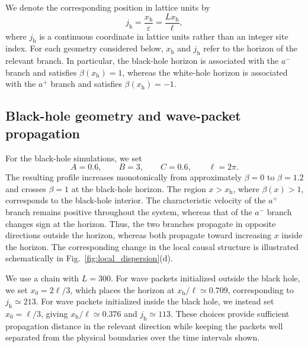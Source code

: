 \documentclass[reprint,amsmath,amssymb,aps,showkeys,superscriptaddress]{revtex4-2}
\begin{document}
We denote the corresponding position in lattice units by
\begin{equation}
  j_{\mathrm h}
  =
  \frac{x_{\mathrm h}}{\varepsilon}
  =
  \frac{Lx_{\mathrm h}}{\ell},
  \label{eq:lattice_horizon_position}
\end{equation}
where $j_{\mathrm h}$ is a continuous coordinate in lattice units
rather than an integer site index. For each geometry considered
below, $x_{\mathrm h}$ and $j_{\mathrm h}$ refer to the horizon of
the relevant branch. In particular, the black-hole horizon is
associated with the $a^-$ branch and satisfies
$\beta(x_{\mathrm h})=1$, whereas the white-hole horizon is
associated with the $a^+$ branch and satisfies
$\beta(x_{\mathrm h})=-1$.


\subsection{Black-hole geometry and wave-packet propagation}
\label{subsec:black_hole_dynamics}

For the black-hole simulations, we set
\begin{equation}
  A=0.6,
  \qquad
  B=3,
  \qquad
  C=0.6,
  \qquad
  \ell=2\pi.
  \label{eq:black_hole_parameters}
\end{equation}
The resulting profile increases monotonically from approximately
$\beta=0$ to $\beta=1.2$ and crosses $\beta=1$ at the
black-hole horizon. The region $x>x_{\mathrm h}$, where
$\beta(x)>1$, corresponds to the black-hole interior. The
characteristic velocity of the $a^+$ branch remains positive
throughout the system, whereas that of the $a^-$ branch changes
sign at the horizon. Thus, the two branches propagate in opposite
directions outside the horizon, whereas both propagate toward
increasing $x$ inside the horizon. The corresponding change in the
local causal structure is illustrated schematically in
Fig.~\ref{fig:local_dispersion}(d).

We use a chain with $L=300$. For wave packets initialized outside
the black hole, we set $x_0=2\ell/3$, which places the horizon at
$x_{\mathrm h}/\ell\simeq0.709$, corresponding to
$j_{\mathrm h}\simeq213$. For wave packets initialized inside the
black hole, we instead set $x_0=\ell/3$, giving
$x_{\mathrm h}/\ell\simeq0.376$ and
$j_{\mathrm h}\simeq113$. These choices provide sufficient
propagation distance in the relevant direction while keeping the
packets well separated from the physical boundaries over the time
intervals shown.
\end{document}
